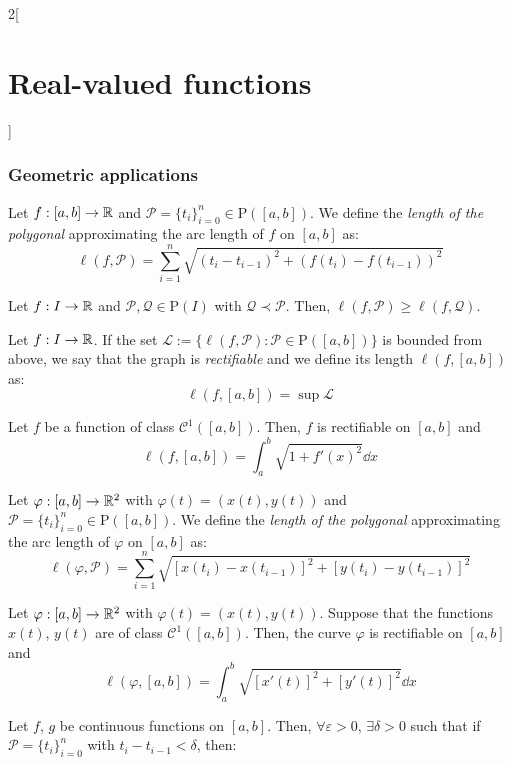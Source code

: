 \documentclass[../../../main_math.tex]{subfiles}
\begin{document}
\begin{multicols}{2}[\section{Real-valued functions}]
  \subsubsection{Geometric applications}
  \begin{definition}
    Let $f:[a,b]\rightarrow\mathbb{R}$ and $\mathcal{P}=\{t_i\}_{i=0}^n\in\mathrm{P}([a,b])$. We define the \emph{length of the polygonal} approximating the arc length of $f$ on $[a,b]$ as: $$\ell(f,\mathcal{P})=\sum_{i=1}^n\sqrt{{(t_i-t_{i-1})}^2+{(f(t_i)-f(t_{i-1}))}^2}$$
  \end{definition}
  \begin{lemma}
    Let $f:I\rightarrow\mathbb{R}$ and $\mathcal{P},\mathcal{Q}\in\mathrm{P}(I)$ with $\mathcal{Q}\prec\mathcal{P}$. Then, $\ell(f,\mathcal{P})\geq \ell(f,\mathcal{Q})$.
  \end{lemma}
  \begin{definition}
    Let $f:I\rightarrow\mathbb{R}$. If the set $\mathcal{L}:=\{\ell(f,\mathcal{P}):\mathcal{P}\in\mathrm{P}([a,b])\}$ is bounded from above, we say that the graph is \emph{rectifiable} and we define its length $\ell(f,[a,b])$ as: $$\ell(f,[a,b])=\sup \mathcal{L}$$
  \end{definition}
  \begin{proposition}
    Let $f$ be a function of class $\mathcal{C}^1([a,b])$. Then, $f$ is rectifiable on $[a,b]$ and $$\ell(f,[a,b])=\int_a^b\sqrt{1+{f'(x)}^2}\dd{x}$$
  \end{proposition}
  \begin{definition}
    Let $\varphi:[a,b]\rightarrow\mathbb{R}^2$ with $\varphi(t)=(x(t),y(t))$ and $\mathcal{P}=\{t_i\}_{i=0}^n\in\mathrm{P}([a,b])$. We define the \emph{length of the polygonal} approximating the arc length of $\varphi$ on $[a,b]$ as: $$\ell(\varphi,\mathcal{P})=\sum_{i=1}^n\sqrt{{[x(t_i)-x(t_{i-1})]}^2+{[y(t_i)-y(t_{i-1})]}^2}$$
  \end{definition}
  \begin{proposition}
    Let $\varphi:[a,b]\rightarrow\mathbb{R}^2$ with $\varphi(t)=(x(t),y(t))$. Suppose that the functions $x(t)$, $y(t)$ are of class $\mathcal{C}^1([a,b])$. Then, the curve $\varphi$ is rectifiable on $[a,b]$ and $$\ell(\varphi,[a,b])=\int_a^b\sqrt{{[x'(t)]}^2+{[y'(t)]}^2}\dd{x}$$
  \end{proposition}
  \begin{lemma}
    Let $f$, $g$ be continuous functions on $[a,b]$. Then, $\forall\varepsilon>0$, $\exists\delta>0$ such that if $\mathcal{P}=\{t_i\}_{i=0}^n$ with $t_i-t_{i-1}<\delta$, then:
    \begin{multline*}

\end{multline*}
\end{lemma}
\end{multicols}
\end{document}
